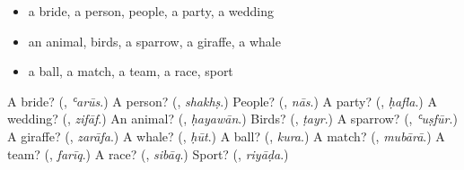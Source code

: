 \begin{itemize}
\raggedright
  \item a bride, a person, people, a party, a wedding
  \item an animal, birds, a sparrow, a giraffe, a whale
  \item a ball, a match, a team, a race, sport
\end{itemize}

\begin{tcolorbox}[breakable,colback=teal!4,colframe=teal!35!black,title={Before you move on}]
A bride? (\textbf{}, \emph{ʿarūs}.) A person? (\textbf{}, \emph{shakhṣ}.) People? (\textbf{}, \emph{nās}.) A party? (\textbf{}, \emph{ḥafla}.) A wedding? (\textbf{}, \emph{zifāf}.) An animal? (\textbf{}, \emph{ḥayawān}.) Birds? (\textbf{}, \emph{ṭayr}.) A sparrow? (\textbf{}, \emph{ʿuṣfūr}.) A giraffe? (\textbf{}, \emph{zarāfa}.) A whale? (\textbf{}, \emph{ḥūt}.) A ball? (\textbf{}, \emph{kura}.) A match? (\textbf{}, \emph{mubārā}.) A team? (\textbf{}, \emph{farīq}.) A race? (\textbf{}, \emph{sibāq}.) Sport? (\textbf{}, \emph{riyāḍa}.)
\end{tcolorbox}
